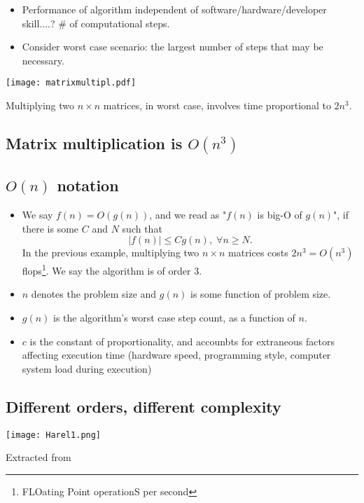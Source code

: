  
      \begin{itemize}
        \item Performance of algorithm independent of software/hardware/developer skill....? \# of computational steps.
        \item Consider worst case scenario: the largest number of steps that may be necessary.
      \end{itemize}
    
      \begin{center}
        \texttt{[image: matrixmultipl.pdf]}
      \end{center}
      \footnotesize
      Multiplying two $n\times n$ matrices, in worst case, involves time proportional to $2n^3$.
      \normalsize
    




\subsection{Matrix multiplication is $O(n^3)$}
  \begin{footnotesize}
  
\end{footnotesize}


\subsection{$O(n)$ notation}
  \begin{itemize}
    \item We say $f(n)=O(g(n))$, and we read as "$f(n)$ is big-O of $g(n)$", if there is some $C$ and $N$ such that
    \[
      |f(n)| \leq C g(n), \; \forall n\geq N.
    \]
    In the previous example, multiplying two $n \times n$ matrices costs $2n^3=O(n^3)$ flops\footnote{FLOating Point operationS per second}. We say the algorithm is of order 3.
    \item $n$ denotes the problem size and $g(n)$ is some function of problem size.
    \item $g(n)$ is the algorithm's worst case step count, as a function of $n$.
    \item $c$ is the constant of proportionality, and accounbts for extraneous factors affecting execution time (hardware speed, programming style, computer system load during execution)
  \end{itemize}



\subsection{Different orders, different complexity}
  \begin{center}
    \texttt{[image: Harel1.png]}
  \end{center}
  Extracted from \cite{harel_algorithmics_2004}


